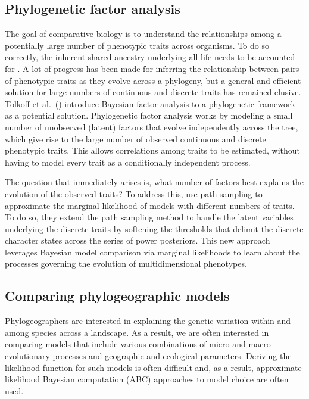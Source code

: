 
\subsection{Phylogenetic factor analysis}

The goal of comparative biology is to understand the relationships among a
potentially large number of phenotypic traits across organisms. 
To do so correctly, the inherent shared ancestry underlying all life needs to
be accounted for \citep{Felsenstein1985PIC}.
A lot of progress has been made for inferring the relationship between pairs
of phenotypic traits as they evolve across a phylogeny,
but a general and efficient solution for large numbers of continuous
and discrete traits has remained elusive.
Tolkoff et al.\ (\citeyear{Tolkoff2017}) introduce Bayesian factor analysis to
a phylogenetic framework as a potential solution.
Phylogenetic factor analysis works by modeling a small number of unobserved
(latent) factors that evolve independently across the tree, which give rise to
the large number of observed continuous and discrete phenotypic traits.
This allows correlations among traits to be estimated, without having to model
every trait as a conditionally independent process.

The question that immediately arises is, what number of factors best explains
the evolution of the observed traits?
To address this, \citep{Tolkoff2017} use path sampling to approximate the
marginal likelihood of models with different numbers of traits.
To do so, they extend the path sampling method to handle the latent variables
underlying the discrete traits by softening the thresholds that delimit the
discrete character states across the series of power posteriors.
This new approach leverages Bayesian model comparison via marginal likelihoods
to learn about the processes governing the evolution of multidimensional
phenotypes.


\subsection{Comparing phylogeographic models}

Phylogeographers are interested in explaining the genetic variation within and
among species across a landscape.
As a result, we are often interested in comparing models that include
various combinations of micro and macro-evolutionary processes and geographic
and ecological parameters.
Deriving the likelihood function for such models is often difficult and, as a
result, approximate-likelihood Bayesian computation (ABC) approaches to model
choice are often used.

